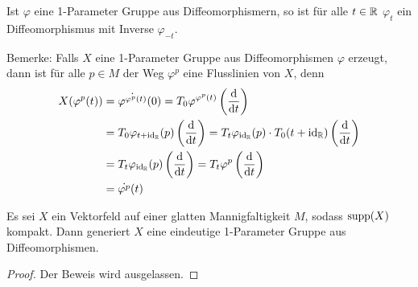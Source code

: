 \documentclass[a4paper,11pt]{article}
\begin{document}
Ist $\varphi$ eine 1-Parameter Gruppe aus Diffeomorphismern, so ist für alle 
$t \in { \mathbb R }$ $\varphi_t$ ein Diffeomorphismus mit Inverse $\varphi_{-t}$.

Bemerke: Falls $X$ eine 1-Parameter Gruppe aus Diffeomorphismen $\varphi$ erzeugt,
dann ist für alle $p \in M$ der Weg $\varphi^p$ eine Flusslinien von $X$, denn
\begin{align*}
    X(\varphi^p(t)) 
    & = \dot{\varphi^{\varphi^p(t)}}(0)
    = T_0 \varphi^{\varphi^p(t)} \left({ \frac{{ \operatorname{d} } }{{ \operatorname{d} } t} }\right) \\
    & = T_0 \varphi_{t + { \operatorname{id} }_{{ \mathbb R }}}(p) \left({ \frac{{ \operatorname{d} } }{{ \operatorname{d} } t} }\right)
    = T_t \varphi_{{ \operatorname{id} }_{{ \mathbb R }}}(p) \cdot T_0 (t + { \operatorname{id} }_{{ \mathbb R }}) \left({ \frac{{ \operatorname{d} } }{{ \operatorname{d} } t} }\right) \\
    & = T_t \varphi_{{ \operatorname{id} }_{{ \mathbb R }}}(p) \left({ \frac{{ \operatorname{d} } }{{ \operatorname{d} } t} }\right)
    = T_t \varphi^p \left({ \frac{{ \operatorname{d} } }{{ \operatorname{d} } t} }\right) \\
    & = \dot{\varphi^p}(t)
\end{align*}

\begin{lemma}
    \label{lemma:generierende vektorfelder}
    Es sei $X$ ein Vektorfeld auf einer glatten Mannigfaltigkeit $M$, sodass
    ${ \operatorname{supp} }(X)$ kompakt. Dann generiert $X$ eine eindeutige 
    1-Parameter Gruppe aus Diffeomorphismen.
\end{lemma}

\begin{proof} Der Beweis wird ausgelassen. \end{proof}
\end{document}
